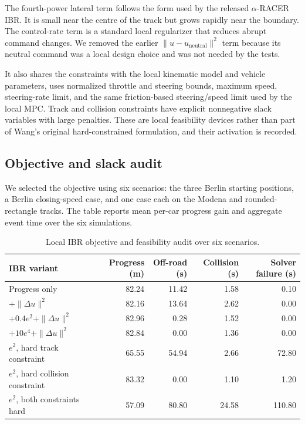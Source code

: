 \documentclass[11pt]{article}
\begin{document}
The
fourth-power lateral term follows the form used by the released
$\alpha$-RACER IBR. It is small near the centre of the track but grows rapidly
near the boundary. The control-rate term is a standard local regularizer that
reduces abrupt command changes. We removed the earlier
$\|u-u_{\mathrm{neutral}}\|^2$ term because its neutral command was a local
design choice and was not needed by the tests.

It also shares the constraints with the local kinematic model and vehicle
parameters, uses normalized throttle and steering bounds, maximum speed,
steering-rate limit, and the same friction-based steering/speed limit used by
the local MPC. Track and collision constraints have explicit nonnegative slack
variables with large penalties. These are local feasibility devices rather
than part of Wang's original hard-constrained formulation, and their activation
is recorded.

\subsection{Objective and slack audit}

We selected the objective using six scenarios: the three Berlin starting
positions, a Berlin closing-speed case, and one case each on the Modena and
rounded-rectangle tracks. The table reports mean per-car progress gain and
aggregate event time over the six simulations.

\begin{table}[ht]
  \centering
  \small
  \begin{tabular}{lrrrr}
    \toprule
    IBR variant & Progress (m) & Off-road (s) & Collision (s) & Solver failure (s) \\
    \midrule
    Progress only & 82.24 & 11.42 & 1.58 & 0.10 \\
    $+\|\Delta u\|^2$ & 82.16 & 13.64 & 2.62 & 0.00 \\
    $+0.4e^2+\|\Delta u\|^2$ & 82.96 & 0.28 & 1.52 & 0.00 \\
    $+10e^4+\|\Delta u\|^2$ & 82.84 & 0.00 & 1.36 & 0.00 \\
    $e^2$, hard track constraint & 65.55 & 54.94 & 2.66 & 72.80 \\
    $e^2$, hard collision constraint & 83.32 & 0.00 & 1.10 & 1.20 \\
    $e^2$, both constraints hard & 57.09 & 80.80 & 24.58 & 110.80 \\
    \bottomrule
  \end{tabular}
  \caption{Local IBR objective and feasibility audit over six scenarios.}
\end{table}
\end{document}
